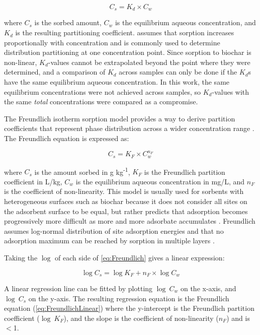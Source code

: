 \begin{equation}\label{eq:linear}
C_s = K_d \times C_w
\end{equation}

where $C_s$ is the sorbed amount, $C_w$ is the equilibrium aqueous concentration, and $K_d$ is the resulting partitioning coefficient.  assumes that sorption increases proportionally with concentration and is commonly used to determine distribution partitioning at one concentration point. Since sorption to biochar is non-linear, $K_d$-values cannot be extrapolated beyond the point where they were determined, and a comparison of $K_d$ across samples can only be done if the $K_d$s have the same equilibrium aqueous concentration. In this work, the same equilibrium concentrations were not achieved across samples, so $K_d$-values with the same \textit{total} concentrations were compared as a compromise. 

The Freundlich isotherm sorption model provides a way to derive partition coefficients that represent phase distribution across a wider concentration range \citep{zhang2013sorption}. The Freundlich equation is expressed as:

\begin{equation} \label{eq:Freundlich}
    C_s = K_F \times C_{w}^{n_F}
\end{equation}

where $C_s$ is the amount sorbed in \textmu g kg\textsuperscript{-1}, $K_F$ is the Freundlich partition coefficient in L/kg, $C_{w}$ is the equilibrium aqueous concentration in mg/L, and $n_F$ is the coefficient of non-linearity. This model is usually used for sorbents with heterogeneous surfaces such as biochar because it does not consider all sites on the adsorbent surface to be equal, but rather predicts that adsorption becomes progressively more difficult as more and more adsorbate accumulates \citep{yin2022insights}. Freundlich assumes log-normal distribution of site adsorption energies and that no adsorption maximum can be reached by sorption in multiple layers \citep{schwarzenbach2005environmental}.

Taking the $\log$ of each side of \cref{eq:Freundlich} gives a linear expression:

\begin{equation} \label{eq:FreundlichLinear}
    \log C_s = \log K_F + n_F \times \log C_{w}
\end{equation}

A linear regression line can be fitted by plotting $\log~C_w$ on the x-axis, and $\log~C_s$ on the y-axis. The resulting regression equation is the Freundlich equation (\cref{eq:FreundlichLinear}) where the y-intercept is the Freundlich partition coefficient ($\log~K_F$), and the slope is the coefficient of non-linearity ($n_F$) and is $<$1. 


